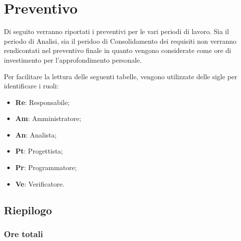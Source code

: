 \documentclass[../piano-di-progetto.tex]{subfiles}
\begin{document}
  \section{Preventivo}
  Di seguito verranno riportati i preventivi per le vari periodi di lavoro. Sia il periodo di Analisi, sia il peridoo di Consolidamento dei requisiti non verranno rendicontati nel preventivo finale in quanto vengono considerate come ore di investimento per l’approfondimento personale.

  Per facilitare la lettura delle seguenti tabelle, vengono utilizzate delle sigle per identificare i ruoli:
  \begin{itemize}
    \item \textbf{Re}: Responsabile;
    \item \textbf{Am}: Amministratore;
    \item \textbf{An}: Analista;
    \item \textbf{Pt}: Progettista;
    \item \textbf{Pr}: Programmatore;
    \item \textbf{Ve}: Verificatore.
  \end{itemize}

  
  
  
  
  

  \subsection{Riepilogo}
  \subsubsection{Ore totali}
\end{document}
